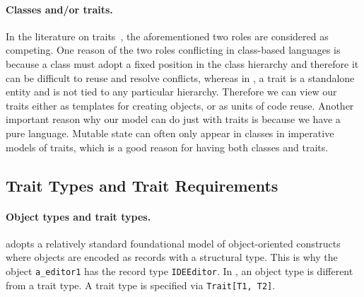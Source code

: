 \paragraph{Classes and/or traits.}

In the literature on traits~\citep{Ducasse_2006, scharli2003traits}, the
aforementioned two roles are considered as competing. One reason of the two
roles conflicting in class-based languages is because a class must adopt a fixed
position in the class hierarchy and therefore it can be difficult to reuse and
resolve conflicts, whereas in \sedel, a trait is a standalone entity and is not
tied to any particular hierarchy. Therefore we can view our traits either as templates for creating objects,
or as units of code reuse. Another important reason why our
model can do just with traits is because we have a pure language. Mutable state
can often only appear in classes in imperative models of traits, which is a good
reason for having both classes and traits.





\subsection{Trait Types and Trait Requirements}

\paragraph{Object types and trait types.}

\sedel adopts a relatively standard foundational model of object-oriented
constructs~\citep{DBLP:conf/ecoop/LeeASP15} where objects are encoded as records
with a structural type. This is why the object \lstinline{a_editor1}
has the record type \lstinline{IDEEditor}. In \sedel, an object type is
different from a trait type. A trait type is specified via \lstinline{Trait[T1, T2]}.

